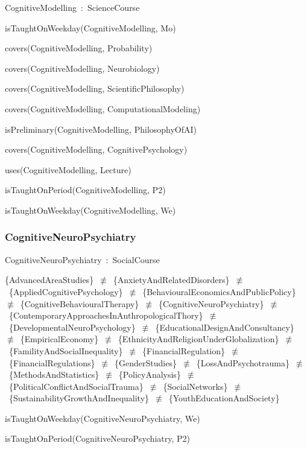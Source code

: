 \documentclass{article}
\begin{document}
CognitiveModelling~:~ScienceCourse

isTaughtOnWeekday(CognitiveModelling, Mo)

covers(CognitiveModelling, Probability)

covers(CognitiveModelling, Neurobiology)

covers(CognitiveModelling, ScientificPhilosophy)

covers(CognitiveModelling, ComputationalModeling)

isPreliminary(CognitiveModelling, PhilosophyOfAI)

covers(CognitiveModelling, CognitivePsychology)

uses(CognitiveModelling, Lecture)

isTaughtOnPeriod(CognitiveModelling, P2)

isTaughtOnWeekday(CognitiveModelling, We)

\subsubsection*{CognitiveNeuroPsychiatry}

CognitiveNeuroPsychiatry~:~SocialCourse

\{AdvancedAreaStudies\}~\ensuremath{\not\equiv}~\{AnxietyAndRelatedDisorders\}~\ensuremath{\not\equiv}~\{AppliedCognitivePsychology\}~\ensuremath{\not\equiv}~\{BehaviouralEconomicsAndPublicPolicy\}~\ensuremath{\not\equiv}~\{CognitiveBehaviouralTherapy\}~\ensuremath{\not\equiv}~\{CognitiveNeuroPsychiatry\}~\ensuremath{\not\equiv}~\{ContemporaryApproachesInAnthropologicalThory\}~\ensuremath{\not\equiv}~\{DevelopmentalNeuroPsychology\}~\ensuremath{\not\equiv}~\{EducationalDesignAndConsultancy\}~\ensuremath{\not\equiv}~\{EmpiricalEconomy\}~\ensuremath{\not\equiv}~\{EthnicityAndReligionUnderGlobalization\}~\ensuremath{\not\equiv}~\{FamilityAndSocialInequality\}~\ensuremath{\not\equiv}~\{FinancialRegulation\}~\ensuremath{\not\equiv}~\{FinancialRegulations\}~\ensuremath{\not\equiv}~\{GenderStudies\}~\ensuremath{\not\equiv}~\{LossAndPsychotrauma\}~\ensuremath{\not\equiv}~\{MethodsAndStatistics\}~\ensuremath{\not\equiv}~\{PolicyAnalysis\}~\ensuremath{\not\equiv}~\{PoliticalConflictAndSocialTrauma\}~\ensuremath{\not\equiv}~\{SocialNetworks\}~\ensuremath{\not\equiv}~\{SustainabilityGrowthAndInequality\}~\ensuremath{\not\equiv}~\{YouthEducationAndSociety\}

isTaughtOnWeekday(CognitiveNeuroPsychiatry, We)

isTaughtOnPeriod(CognitiveNeuroPsychiatry, P2)
\end{document}
